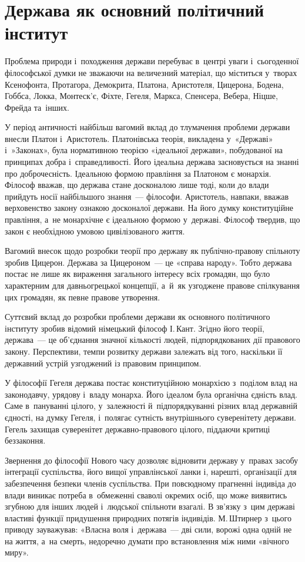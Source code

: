\documentclass[a5paper,oneside,DIV=12,12pt,headings=small]{scrartcl}
\begin{document}
\section{Держава як основний політичний інститут}
	Проблема природи і~походження держави перебуває в~центрі уваги і~сьогоденної філософської думки не зважаючи на величезний матеріал, що міститься у~творах Ксенофонта, Протагора, Демокрита, Платона, Аристотеля, Цицерона, Бодена, Гоббса, Локка, Монтеск'є, Фіхте, Гегеля, Маркса, Спенсера, Вебера, Ніцше, Фрейда та~інших.
	
	У період античності найбільш вагомий вклад до тлумачення проблеми держави внесли Платон і~Аристотель. Платонівська теорія, викладена у~«Державі» і~»Законах», була нормативною теорією «ідеальної держави», побудованої на принципах добра і~справедливості. Його ідеальна держава засновується на знанні про доброчесність. Ідеальною формою правління за Платоном є монархія. Філософ вважав, що держава стане досконалою лише тоді, коли до влади прийдуть носії найбільшого знання~— філософи. Аристотель, навпаки, вважав верховенство закону ознакою досконалої держави. На його думку конституційне правління, а~не монархічне є ідеальною формою у~державі. Філософ твердив, що закон є необхідною умовою цивілізованого життя.
	
	Вагомий внесок щодо розробки теорії про державу як публічно-правову спільноту зробив Цицерон. Держава за Цицероном~— це «справа народу». Тобто держава постає не лише як вираження загального інтересу всіх громадян, що було характерним для давньогрецької концепції, а~й~як узгоджене правове спілкування цих громадян, як певне правове утворення.
	
	Суттєвий вклад до розробки проблеми держави як основного політичного інституту зробив відомий німецький філософ І.\,Кант. Згідно його теорії, держава~— це об'єднання значної кількості людей, підпорядкованих дії правового закону. Перспективи, темпи розвитку держави залежать від того, наскільки її державний устрій узгоджений із правовим принципом.
	
	У філософії Гегеля держава постає конституційною монархією з~поділом влад на законодавчу, урядову і~владу монарха. Його ідеалом була органічна єдність влад. Саме в~пануванні цілого, у~залежності й~підпорядкуванні різних влад державній єдності, на думку Гегеля, і~полягає сутність внутрішнього суверенітету держави. Гегель захищав суверенітет державно-правового цілого, піддаючи критиці беззаконня.
	
	Звернення до філософії Нового часу дозволяє відновити державу у~правах засобу інтеграції суспільства, його вищої управлінської ланки і, нарешті, організації для забезпечення безпеки членів суспільства. При повсюдному прагненні індивіда до влади виникає потреба в~обмеженні сваволі окремих осіб, що може виявитись згубною для інших людей і~людської спільноти взагалі. В зв'язку з~цим державі властиві функції придушення природних потягів індивідів. М.\,Штирнер з~цього приводу зауважував: «Власна воля і~держава~— дві сили, ворожі одна одній не на життя, а~на смерть, недоречно думати про встановлення між ними «вічного миру».
	
\end{document}
